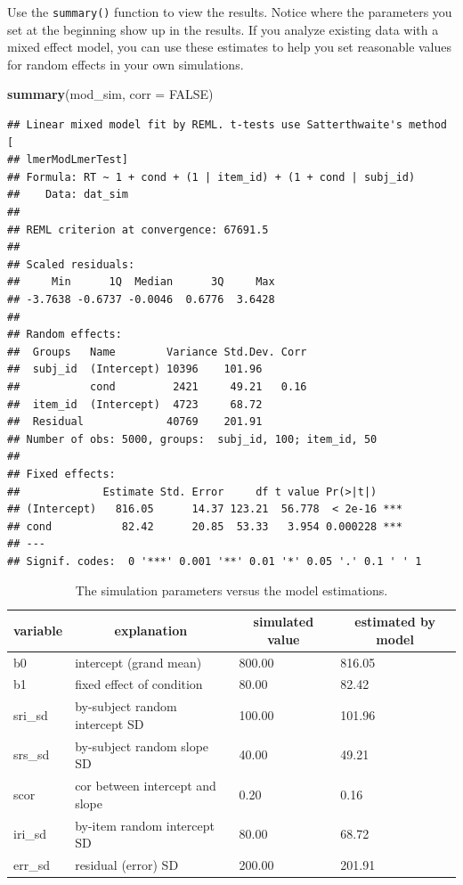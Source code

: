 \documentclass[man,floatsintext]{apa6}
\newenvironment{Shaded}{\begin{snugshade}}{\end{snugshade}}
\newcommand{\KeywordTok}[1]{\textcolor[rgb]{0.13,0.29,0.53}{\textbf{#1}}}
\newcommand{\DataTypeTok}[1]{\textcolor[rgb]{0.13,0.29,0.53}{#1}}
\newcommand{\OtherTok}[1]{\textcolor[rgb]{0.56,0.35,0.01}{#1}}
\newcommand{\NormalTok}[1]{#1}
\begin{document}
Use the \texttt{summary()} function to view the results. Notice where
the parameters you set at the beginning show up in the results. If you
analyze existing data with a mixed effect model, you can use these
estimates to help you set reasonable values for random effects in your
own simulations.

\begin{Shaded}
\begin{Highlighting}[]
\KeywordTok{summary}\NormalTok{(mod_sim, }\DataTypeTok{corr =} \OtherTok{FALSE}\NormalTok{)}
\end{Highlighting}
\end{Shaded}

\begin{verbatim}
## Linear mixed model fit by REML. t-tests use Satterthwaite's method [
## lmerModLmerTest]
## Formula: RT ~ 1 + cond + (1 | item_id) + (1 + cond | subj_id)
##    Data: dat_sim
## 
## REML criterion at convergence: 67691.5
## 
## Scaled residuals: 
##     Min      1Q  Median      3Q     Max 
## -3.7638 -0.6737 -0.0046  0.6776  3.6428 
## 
## Random effects:
##  Groups   Name        Variance Std.Dev. Corr
##  subj_id  (Intercept) 10396    101.96       
##           cond         2421     49.21   0.16
##  item_id  (Intercept)  4723     68.72       
##  Residual             40769    201.91       
## Number of obs: 5000, groups:  subj_id, 100; item_id, 50
## 
## Fixed effects:
##             Estimate Std. Error     df t value Pr(>|t|)    
## (Intercept)   816.05      14.37 123.21  56.778  < 2e-16 ***
## cond           82.42      20.85  53.33   3.954 0.000228 ***
## ---
## Signif. codes:  0 '***' 0.001 '**' 0.01 '*' 0.05 '.' 0.1 ' ' 1
\end{verbatim}

\begin{table}[tbp]
\begin{center}
\begin{threeparttable}
\caption{\label{tab:unnamed-chunk-8}The simulation parameters versus the model estimations.}
\begin{tabular}{llll}
\toprule
variable & \multicolumn{1}{c}{explanation} & \multicolumn{1}{c}{simulated value} & \multicolumn{1}{c}{estimated by model}\\
\midrule
b0 & intercept (grand mean) & 800.00 & 816.05\\
b1 & fixed effect of condition & 80.00 & 82.42\\
sri\_sd & by-subject random intercept SD & 100.00 & 101.96\\
srs\_sd & by-subject random slope SD & 40.00 & 49.21\\
scor & cor between intercept and slope & 0.20 & 0.16\\
iri\_sd & by-item random intercept SD & 80.00 & 68.72\\
err\_sd & residual (error) SD & 200.00 & 201.91\\
\bottomrule
\end{tabular}
\end{threeparttable}
\end{center}
\end{table}
\end{document}
